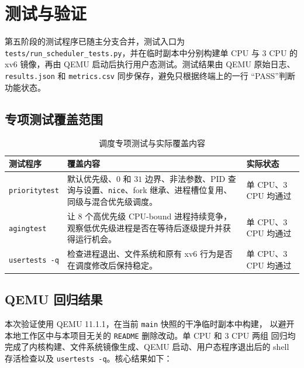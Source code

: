 \section{测试与验证}

第五阶段的测试程序已随主分支合并，测试入口为
\texttt{tests/run\_scheduler\_tests.py}，并在临时副本中分别构建单 CPU 与
3 CPU 的 xv6 镜像，再由 QEMU 启动后执行用户态测试。测试结果由 QEMU 原始日志、
\texttt{results.json} 和 \texttt{metrics.csv} 同步保存，避免只根据终端上的一行
“PASS”判断功能状态。

\subsection{专项测试覆盖范围}

\begin{table}[htbp]
  \centering
  \caption{调度专项测试与实际覆盖内容}
  \label{tab:scheduler-tests}
  \begin{tabularx}{\textwidth}{C{2.3cm}X C{2.4cm}}
    \toprule
    测试程序 & 覆盖内容 & 实际状态 \\
    \midrule
    \texttt{prioritytest} & 默认优先级、$0$ 和 $31$ 边界、非法参数、PID 查询与设置、\texttt{nice}、fork 继承、进程槽位复用、同级与混合优先级调度。 & 单 CPU、3 CPU 均通过 \\
    \texttt{agingtest} & 让 8 个高优先级 CPU-bound 进程持续竞争，观察低优先级进程是否在等待后逐级提升并获得运行机会。 & 单 CPU、3 CPU 均通过 \\
    \texttt{usertests -q} & 检查进程退出、文件系统和原有 xv6 行为是否在调度修改后保持稳定。 & 单 CPU、3 CPU 均通过 \\
    \bottomrule
  \end{tabularx}
\end{table}

\subsection{QEMU 回归结果}

本次验证使用 QEMU 11.1.1，在当前 \texttt{main} 快照的干净临时副本中构建，
以避开本地工作区中与本项目无关的 \texttt{README} 删除改动。单 CPU 和 3 CPU 两组
回归均完成了内核构建、文件系统镜像生成、QEMU 启动、用户态程序退出后的 shell
存活检查以及 \texttt{usertests -q}。核心结果如下：

